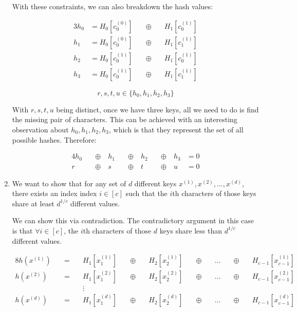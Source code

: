 \documentclass[11pt]{article}
\theoremstyle{definition}
\theoremstyle{case}
\theoremstyle{theorem}
\begin{document}
\begin{enumerate}[label=(\alph*)]
With these constraints, we can also breakdown the hash values:

\begin{alignat}{3}
  h_0 &= H_0[c_0^{(0)}] \quad &\oplus \quad &H_1[c_0^{(1)}] \\
  h_1 &= H_0[c_0^{(0)}] \quad &\oplus \quad &H_1[c_1^{(1)}] \\
  h_2 &= H_0[c_0^{(1)}] \quad &\oplus \quad &H_1[c_0^{(1)}] \\
  h_3 &= H_0[c_0^{(1)}] \quad &\oplus \quad &H_1[c_1^{(1)}]
\end{alignat}

\[
  r, s, t, u \in \{ h_0, h_1, h_2, h_3 \}
\]

With $r, s, t, u$ being distinct, once we have three keys, all we need to 
do is find the missing pair of characters. This can be achieved with an
interesting observation about $h_0, h_1, h_2, h_3$, which is that they represent
the set of all possible hashes. Therefore:

\begin{alignat}{4}
  h_0 \quad &\oplus \quad h_1 \quad &\oplus \quad h_2 \quad &\oplus \quad h_3 &= 0 \\
  r \quad &\oplus \quad s \quad &\oplus \quad t \quad &\oplus \quad u &= 0
\end{alignat}

\item We want to show that for any set of $d$ different keys $x^{(1)}, x^{(2)}, \hdots, x^{(d)}$, there exists an index index $i \in [c]$ such
that the $i$th characters of those keys share at least $d^{1/c}$ different values. 

We can show this via contradiction. The contradictory argument in this case is that $\forall i \in [c]$, the $i$th
characters of those $d$ keys share less than $d^{1/c}$ different values. 

\begin{alignat}{8}
  h(x^{(1)}) \quad &= \quad &H_1[x_1^{(1)}] \quad &\oplus \quad &H_2[x_2^{(1)}] \quad &\oplus \quad &\hdots \quad &\oplus \quad &H_{c-1}[x_{c-1}^{(1)}] \\
  h(x^{(2)}) \quad &= \quad &H_1[x_1^{(2)}] \quad &\oplus \quad &H_2[x_2^{(2)}] \quad &\oplus \quad &\hdots \quad &\oplus \quad &H_{c-1}[x_{c-1}^{(2)}] \\
                   &        &\vdots          &             &                &             &             &             &              \\
  h(x^{(d)}) \quad &= \quad &H_1[x_1^{(d)}] \quad &\oplus \quad &H_2[x_2^{(d)}] \quad &\oplus \quad &\hdots \quad &\oplus \quad &H_{c-1}[x_{c-1}^{(d)}] 
\end{alignat}


\end{enumerate}
\end{document}
